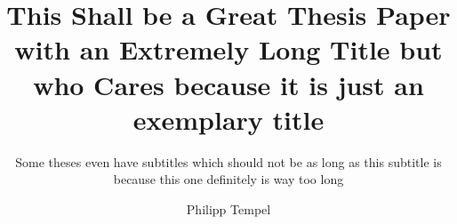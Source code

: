 \title{This Shall be a Great Thesis Paper with an Extremely Long Title but who Cares because it is just an exemplary title}
\subtitle{Some theses even have subtitles which should not be as long as this subtitle is because this one definitely is way too long}
\author{Philipp Tempel}
\date{}

\usepackage{lipsum}
